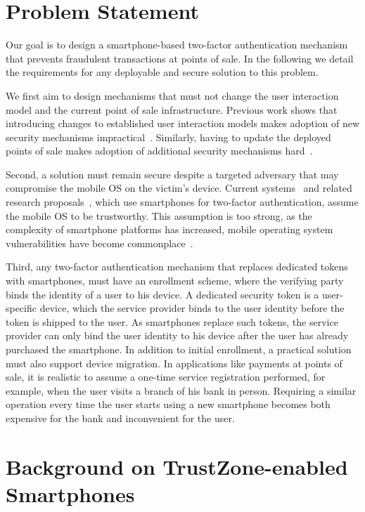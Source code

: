 \section{Problem Statement}
\label{sec:ps_tee_problem}

Our goal is to design a smartphone-based two-factor authentication mechanism
that prevents fraudulent transactions at points of sale.  In the following we
detail the requirements for any deployable and secure solution to this
problem.

We first aim to design mechanisms that must not change the user interaction
model and the current point of sale infrastructure.  Previous work shows that
introducing changes to established user interaction models makes adoption of new
security mechanisms impractical~\cite{bonneau12sp}.  Similarly, having to update
the deployed points of sale makes adoption of additional security mechanisms
hard~\cite{Guida04}.

Second, a solution must remain secure despite a targeted adversary that may
compromise the mobile OS on the victim's device.  Current
systems~\cite{barclays_pinsentry, google_authentication} and related research
proposals~\cite{czeskis12ccs, Mannan11}, which use smartphones for two-factor
authentication, assume the mobile OS to be trustworthy.  This assumption is too
strong, as the complexity of smartphone platforms has increased, mobile
operating system vulnerabilities have become commonplace~\cite{Felt11,
  zhou2012sp}.

Third, any two-factor authentication mechanism that replaces dedicated tokens
with smartphones, must have an enrollment scheme, where the verifying
party binds the identity of a user to his device.  A dedicated security token is
a user-specific device, which the service provider binds to the user identity
before the token is shipped to the user. As smartphones replace such tokens, the
service provider can only bind the user identity to his device after the user
has already purchased the smartphone. In addition to initial enrollment, a
practical solution must also support device migration. In applications like
payments at points of sale, it is realistic to assume a one-time service
registration performed, for example, when the user visits a branch of his bank
in person. Requiring a similar operation every time the user starts using a new
smartphone becomes both expensive for the bank and inconvenient for the user.

\section{Background on TrustZone-enabled Smartphones}
\label{sec:ps_tee_mobile}

